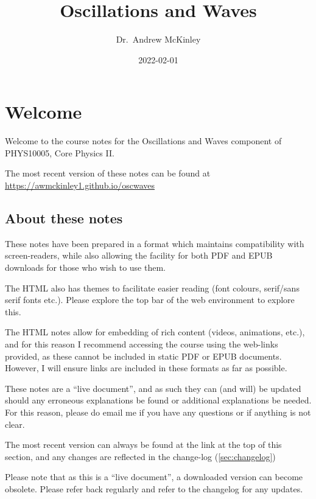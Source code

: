 \documentclass[
]{book}
\title{Oscillations and Waves}
\author{Dr.~Andrew McKinley}
\date{2022-02-01}
\begin{document}
\maketitle

{
\setcounter{tocdepth}{1}
\tableofcontents
}
\hypertarget{welcome}{%
\chapter*{Welcome}\label{welcome}}

Welcome to the course notes for the Oscillations and Waves component of PHYS10005, Core Physics II.

The most recent version of these notes can be found at \url{https://awmckinley1.github.io/oscwaves}

\hypertarget{about-these-notes}{%
\section*{About these notes}\label{about-these-notes}}

These notes have been prepared in a format which maintains compatibility with screen-readers, while also allowing the facility for both PDF and EPUB downloads for those who wish to use them.

The HTML also has themes to facilitate easier reading (font colours, serif/sans serif fonts etc.). Please explore the top bar of the web environment to explore this.

The HTML notes allow for embedding of rich content (videos, animations, etc.), and for this reason I recommend accessing the course using the web-links provided, as these cannot be included in static PDF or EPUB documents. However, I will ensure links are included in these formats as far as possible.

These notes are a ``live document'', and as such they can (and will) be updated should any erroneous explanations be found or additional explanations be needed. For this reason, please do email me if you have any questions or if anything is not clear.

The most recent version can always be found at the link at the top of this section, and any changes are reflected in the change-log (\ref{sec:changelog})

Please note that as this is a ``live document'', a downloaded version can become obsolete. Please refer back regularly and refer to the changelog for any updates.
\end{document}
